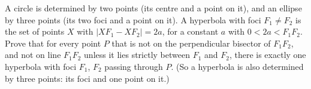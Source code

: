 A circle is determined by two points (its centre and a point on it), and an ellipse by three points (its two foci and a point on it). A hyperbola with foci $F_1\ne F_2$ is the set of points $X$ with $\left|XF_1-XF_2\right|=2a$, for a constant $a$ with $0<2a<F_1F_2$. Prove that for every point $P$ that is not on the perpendicular bisector of $F_1F_2$, and not on line $F_1F_2$ unless it lies strictly between $F_1$ and $F_2$, there is exactly one hyperbola with foci $F_1$, $F_2$ passing through $P$. (So a hyperbola is also determined by three points: its foci and one point on it.)
